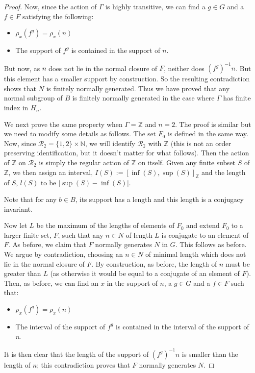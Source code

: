 \documentclass[11pt,a4paper]{amsart}
\theoremstyle{definition}
\theoremstyle{remark}
\newcommand{\Z}{\mathbb Z}
\newcommand{\N}{\mathbb N}
\newcommand{\Ra}{\mathcal{R}}
\begin{document}
\begin{proof}
Now, since the action of $\Gamma$ is highly transitive, we can find a $g \in G$ and a $f \in F$ satisfying the following: 
\begin{itemize}
	\item $\rho_x(f^g) = \rho_x(n)$
	\item The support of $f^g$ is contained in the support of $n$. 
\end{itemize}
But now, as $n$ does not lie in the normal closure of $F$, neither does ${(f^g)}^{-1} n$. But this element has a smaller support by construction. So the resulting contradiction shows that $N$ is finitely normally generated. Thus we have proved that any normal subgroup of $B$ is finitely normally generated in the case where $\Gamma$ has finite index in $H_n$. 

\medspace

We next prove the same property when $\Gamma=\Z$ and $n=2$. The proof is similar but we need to modify some details as follows. The set $F_0$ is defined in the same way. Now, since $\Ra_2 = \{ 1,2\} \times \N$, we will identify $\Ra_2$ with $\Z$ (this is not an order preserving identification, but it doesn't matter for what follows). Then the action of $\Z$ on $\Ra_2$ is simply the regular action of $\Z$ on itself. Given any finite subset $S$ of $\Z$, we then assign an interval, $I(S):=[\inf(S),\sup(S)]_{\Z}$ and the length of $S$, $l(S)$ to be $|\sup(S) - \inf(S)|$. 

Note that for any $b \in B$, its support has a length and this length is a conjugacy invariant. 

Now let $L$ be the maximum of the lengths of elements of $F_0$ and extend $F_0$ to a larger finite set, $F$, such that any $n \in N$ of length $L$ is conjugate to an element of $F$. As before, we claim that $F$ normally generates $N$ in $G$. This follows as before. We argue by contradiction, choosing an $n \in N$ of minimal length which does not lie in the normal closure of $F$. By construction, as before, the length of $n$ must be greater than $L$ (as otherwise it would be equal to a conjugate of an element of $F$). Then, as before, we can find an $x$ in the support of $n$, a $g \in G$ and a $f \in F$ such that: 
\begin{itemize}
	\item $\rho_x(f^g) = \rho_x(n)$
	\item The interval of the support of $f^g$ is contained in the interval of the support of $n$. 
\end{itemize}
It is then clear that the length of the support of ${(f^g)}^{-1} n$ is smaller than the length of $n$; this contradiction proves that $F$ normally generates $N$.


\end{proof}
\end{document}
